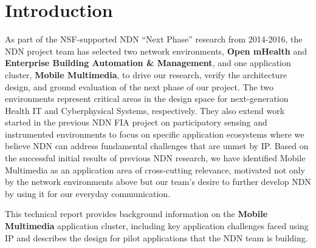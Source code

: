 \section{Introduction}

As part of the NSF-supported NDN ``Next Phase'' research from 2014-2016, 
the NDN project team has selected two network environments, {\bf Open mHealth} and {\bf
Enterprise Building Automation \& Management}, and one application
cluster, {\bf Mobile Multimedia}, to drive our research, verify the
architecture design, and ground evaluation of the next phase of our project.
The two environments represent critical areas in the design space for
next-generation Health IT and Cyberphysical Systems, respectively.  They
also extend work started in the previous NDN FIA project on participatory
sensing and instrumented environments to focus on specific application
ecosystems where we believe NDN can address fundamental challenges that
are unmet by IP.  Based on the successful initial results of previous
NDN research, we have identified Mobile  Multimedia as an application
area of cross-cutting relevance, motivated not only by the
network environments above but our team's desire to further develop
NDN by using it for our everyday communication.

This technical report provides background information on the {\bf Mobile Multimedia}
application cluster, including key application challenges faced using
IP and describes the design for pilot applications that the NDN team is 
building.  

